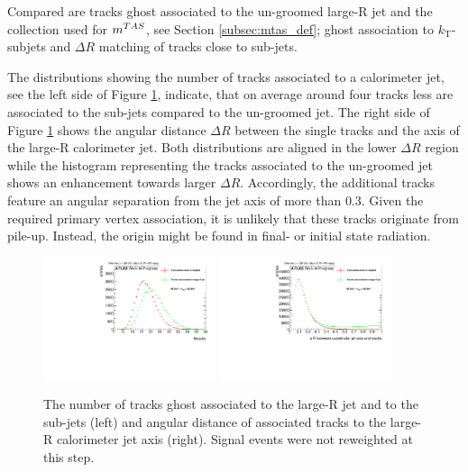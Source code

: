 Compared are tracks ghost associated to the un-groomed large-R jet and the collection used for $m^{TAS}$, see Section \ref{subsec:mtas_def}; ghost association to $k_{\text{T}}$-subjets and $\Delta R$ matching of tracks close to sub-jets.

The distributions showing the number of tracks associated to a calorimeter jet, see the left side of Figure \ref{fig:delta_R}, indicate, that on average around four tracks less are associated to the sub-jets compared to the un-groomed jet. The right side of Figure \ref{fig:delta_R} shows the angular distance $\Delta R$ between the single tracks and the axis of the large-R calorimeter jet. Both distributions are aligned in the lower $\Delta R$ region while the histogram representing the tracks associated to the un-groomed jet shows an enhancement towards larger $\Delta R$. Accordingly, the additional tracks feature an angular separation from the jet axis of more than $0.3$. Given the required primary vertex association, it is unlikely that these tracks originate from pile-up. Instead, the origin might be found in final- or initial state radiation. 
\begin{figure}
	\centering
	\includegraphics[width=0.45\textwidth]{sascha_input/plots/track_selection/h_customghost_number.pdf} \hspace{1mm}
	\includegraphics[width=0.45\textwidth]{sascha_input/plots/track_selection/h_customghost_dr.pdf}
\caption{\footnotesize{The number of tracks ghost associated to the large-R jet and to the sub-jets (left) and angular distance of associated tracks to the large-R calorimeter jet axis (right). Signal events were not reweighted at this step.}}\label{fig:delta_R}
\end{figure}


